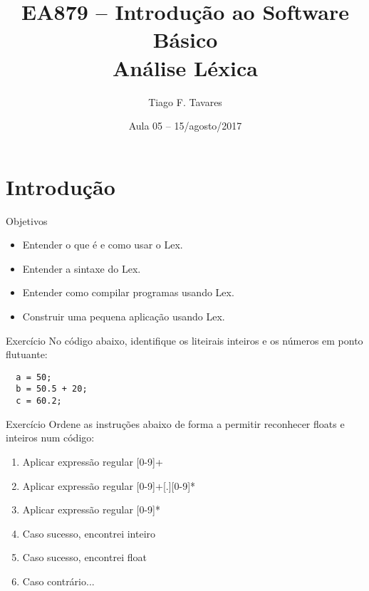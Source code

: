 \documentclass{beamer}
\title[05-Análise Léxica]{EA879 -- Introdução ao Software Básico\\Análise Léxica}
\author{Tiago F. Tavares}
\institute{FEEC -- UNICAMP}
\date{Aula 05 -- 15/agosto/2017}
\begin{document}
\begin{frame}
  \titlepage
\end{frame}


\section{Introdução}

\begin{frame}{Objetivos}
  \Large
  \begin{itemize}
    \item Entender o que é e como usar o Lex.
    \item Entender a sintaxe do Lex.
    \item Entender como compilar programas usando Lex.
    \item Construir uma pequena aplicação usando Lex.
  \end{itemize}
\end{frame}

\begin{frame}[fragile]{Exercício}
  \centering
  No código abaixo, identifique os liteirais inteiros e os números em ponto
  flutuante:

  \begin{verbatim}
  a = 50;
  b = 50.5 + 20;
  c = 60.2;
  \end{verbatim}

\end{frame}

\begin{frame}{Exercício}
  Ordene as instruções abaixo de forma a permitir reconhecer floats e inteiros
  num código:
  \begin{enumerate}
    \item Aplicar expressão regular \textsc{[0-9]+}
    \item Aplicar expressão regular \textsc{[0-9]+[.][0-9]*}
    \item Aplicar expressão regular \textsc{[0-9]*}
    \item Caso sucesso, encontrei inteiro
    \item Caso sucesso, encontrei float
    \item Caso contrário...
  \end{enumerate}

\end{frame}
\end{document}
